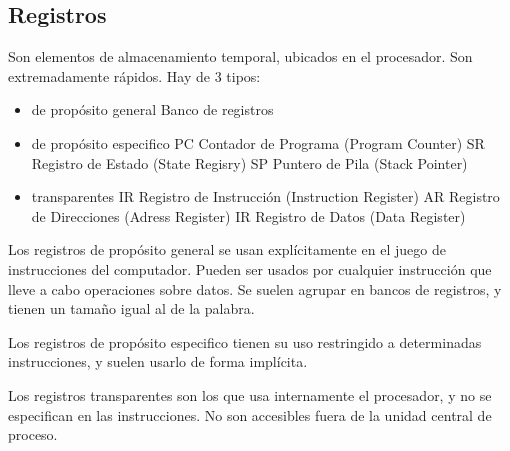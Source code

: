 \documentclass[a4paper,11pt,spanish]{report}
\begin{document}
\subsection{Registros}
Son elementos de almacenamiento temporal, ubicados en el procesador. Son extremadamente rápidos. Hay de 3 tipos:
\begin{itemize}
\item de propósito general
\subitem Banco de registros
\item de propósito especifico
\subitem PC \textrightarrow Contador de Programa (Program Counter)
\subitem SR \textrightarrow Registro de Estado (State Regisry)
\subitem SP \textrightarrow Puntero de Pila (Stack Pointer)
\item transparentes
\subitem IR \textrightarrow Registro de Instrucción (Instruction Register)
\subitem AR \textrightarrow Registro de Direcciones (Adress Register)
\subitem IR \textrightarrow Registro de Datos (Data Register)
\end{itemize}
Los registros de propósito general se usan explícitamente en el juego de instrucciones del computador. Pueden ser usados por cualquier instrucción que lleve a cabo operaciones sobre datos. Se suelen agrupar en bancos de registros, y tienen un tamaño igual al de la palabra.

Los registros de propósito especifico tienen su uso restringido a determinadas instrucciones, y suelen usarlo de forma implícita.

Los registros transparentes son los que usa internamente el procesador, y no se especifican en las instrucciones. No son accesibles fuera de la unidad central de proceso.
\end{document}
